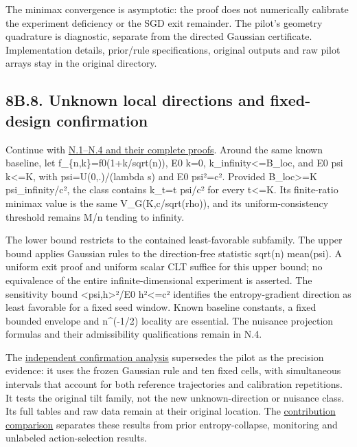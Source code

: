 The minimax convergence is asymptotic: the proof does not numerically
calibrate the experiment deficiency or the SGD exit remainder. The
pilot's geometry quadrature is diagnostic, separate from the directed
Gaussian certificate. Implementation details, prior/rule specifications,
original outputs and raw pilot arrays stay in the original directory.

\subsection{8B.8. Unknown local directions and fixed-design
confirmation}\label{local_prediction-b.8.-unknown-local-directions-and-fixed-design-confirmation}

Continue with \href{unknown_direction.md}{N.1--N.4 and their complete
proofs}. Around the same known baseline, let f\_\{n,k\}=f0(1+k/sqrt(n)),
E0 k=0, \textbar\textbar k\textbar\textbar\_infinity\textless=B\_loc,
and \textbar E0 psi k\textbar\textless=K, with psi=U(0,.)/(lambda s) and
E0 psi²=c². Provided B\_loc\textgreater=K
\textbar\textbar psi\textbar\textbar\_infinity/c², the class contains
k\_t=t psi/c² for every \textbar t\textbar\textless=K. Its finite-ratio
minimax value is the same V\_G(K,c/sqrt(rho)), and its
uniform-consistency threshold remains M/n tending to infinity.

The lower bound restricts to the contained least-favorable subfamily.
The upper bound applies Gaussian rules to the direction-free statistic
sqrt(n) mean(psi). A uniform exit proof and uniform scalar CLT suffice
for this upper bound; no equivalence of the entire infinite-dimensional
experiment is asserted. The sensitivity bound
\textless psi,h\textgreater²/E0 h²\textless=c² identifies the
entropy-gradient direction as least favorable for a fixed seed window.
Known baseline constants, a fixed bounded envelope and n\^{}(-1/2)
locality are essential. The nuisance projection formulas and their
admissibility qualifications remain in N.4.

The
\href{../experiments/results/precision_confirmation/analysis.md}{independent
confirmation analysis} supersedes the pilot as the precision evidence:
it uses the frozen Gaussian rule and ten fixed cells, with simultaneous
intervals that account for both reference trajectories and calibration
repetitions. It tests the original tilt family, not the new
unknown-direction or nuisance class. Its full tables and raw data remain
at their original location. The \href{RELATED_WORK.md}{contribution
comparison} separates these results from prior entropy-collapse,
monitoring and unlabeled action-selection results.
